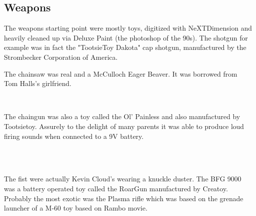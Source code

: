 \par
{}





\subsection{Weapons}
The weapons starting point were mostly toys, digitized with NeXTDimension and heavily cleaned up via Deluxe Paint (the photoshop of the 90s). The shotgun for example was in fact the "TootsieToy Dakota" cap shotgun, manufactured by the Strombecker Corporation of America.\\
\par
{}
\par
The chainsaw was real and a McCulloch Eager Beaver. It was borrowed from Tom Halls's girlfriend.\\
\par
{}
\par

\par
{}\\
\par

The chaingun was also a toy called the Ol' Painless and also manufactured by Tootsietoy. Assurely to the delight of many parents it was able to produce loud firing sounds when connected to a 9V battery.\\
\par
{}\\
\par



\par
{}\\


The fist were actually Kevin Cloud's wearing a knuckle duster. The BFG 9000 was a battery operated toy called the RoarGun manufactured by Creatoy. Probably the most exotic was the Plasma rifle which was based on the grenade launcher of a M-60 toy based on Rambo movie.\\
\par
{}\\
\par
{}\\
\pagebreak










